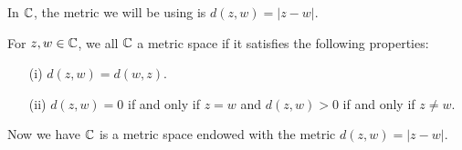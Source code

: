 \documentclass[a4paper]{article}
\begin{document}
In \( \mathbb{C}  \), the metric we will be using is \( d(z,w) =  | z - w  |  \).

\begin{definition}
   For \( z,w \in \mathbb{C}  \), we all \( \mathbb{C}  \) a metric space if it satisfies the following properties: 
   \begin{enumerate}
       \item[(i)] \( d(z,w) = d(w,z) \).
        \item[(ii)] \( d(z,w) = 0  \) if and only if \( z = w  \) and \( d(z,w) > 0  \) if and only if \( z \neq w  \).
   \end{enumerate}
\end{definition}

Now we have \( \mathbb{C}  \) is a metric space endowed with the metric \( d(z,w) = | z - w  |  \).
\end{document}
